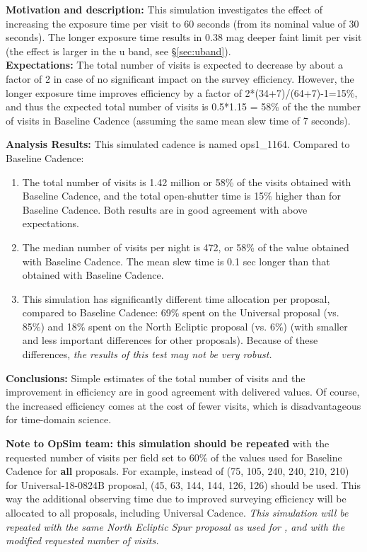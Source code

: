 {\bf Motivation and description:} This simulation investigates the effect of increasing the
exposure time per visit to 60 seconds (from its nominal value of 30 seconds). The longer
exposure time results in 0.38 mag deeper faint limit per visit (the effect is larger in the
u band, see \S\ref{sec:uband}). \\

{\bf Expectations:} The total number of visits is expected to decrease by about a factor of 2
in case of no significant impact on the survey efficiency. However, the longer exposure time
improves efficiency by a factor of 2*(34+7)/(64+7)-1=15\%, and thus the expected total
number of visits is 0.5*1.15 = 58\% of the the number of visits in Baseline Cadence (assuming
the same mean slew time of 7 seconds).

{\bf Analysis Results:} This simulated cadence is named ops1\_1164.
Compared to Baseline Cadence:
\begin{enumerate}
\item The total number of visits is 1.42 million or 58\% of the visits obtained with
Baseline Cadence, and the total open-shutter time is 15\% higher than for Baseline
Cadence. Both results are in good agreement with above expectations.
\item The median number of visits per night is 472, or 58\% of the value obtained with
Baseline Cadence. The mean slew time is 0.1 sec longer than that obtained with Baseline
Cadence.
\item This simulation has significantly different time allocation per proposal, compared
to Baseline Cadence: 69\% spent on the Universal proposal (vs. 85\%) and 18\%  spent
on the North Ecliptic proposal (vs. 6\%)  (with smaller and less important differences for other
proposals). Because of these differences, {\it the results of this test may not be very robust.}
\end{enumerate}

{\bf Conclusions:}
Simple estimates of the total number of visits and the improvement in efficiency are
in good agreement with delivered values. Of course, the increased efficiency comes at the
cost of fewer visits, which is disadvantageous for time-domain science.

{\bf Note to OpSim team: this simulation should be repeated} with the requested number of visits
per field set to 60\% of the values used for Baseline Cadence for {\bf all} proposals.
For example, instead of (75, 105, 240, 240, 210, 210) for Universal-18-0824B proposal,
(45, 63, 144, 144, 126, 126) should be used.  This way the additional observing time due to
improved surveying efficiency will be allocated to all proposals, including Universal Cadence.
 {\it This simulation will be repeated with the same North Ecliptic Spur proposal as used for
, and with the modified requested number of visits.}



